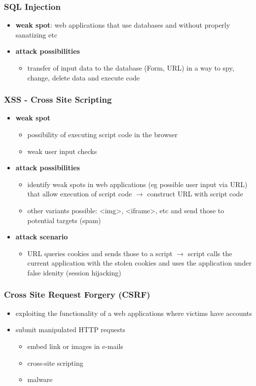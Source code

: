 \documentclass[11pt]{article}
\begin{document}
\subsubsection{SQL Injection}
\label{sec:orgee8e62e}
\begin{itemize}
\item \textbf{weak spot}: web applications that use databases and without properly sanatizing etc
\item \textbf{attack possibilities}
\begin{itemize}
\item transfer of input data to the database (Form, URL) in a way to spy, change, delete data and execute code
\end{itemize}
\end{itemize}
\subsubsection{XSS - Cross Site Scripting}
\label{sec:org5943793}
\begin{itemize}
\item \textbf{weak spot}
\begin{itemize}
\item possibility of executing script code in the browser
\item weak user input checks
\end{itemize}
\item \textbf{attack possibilities}
\begin{itemize}
\item identify weak spots in web applications (eg possible user input via URL) that allow execution of script code \(\rightarrow\) construct URL with script code
\item other variants possible: <img>, <iframe>, etc and send those to potential targets (spam)
\end{itemize}
\item \textbf{attack scenario}
\begin{itemize}
\item URL queries cookies and sends those to a script \(\rightarrow\) script calls the current application with the stolen cookies and uses the application under false idenity (session hijacking)
\end{itemize}
\end{itemize}
\subsubsection{Cross Site Request Forgery (CSRF)}
\label{sec:org653fc96}
\begin{itemize}
\item exploiting the functionality of a web applications where victims have accounts
\item submit manipulated HTTP requests
\begin{itemize}
\item embed link or images in e-mails
\item cross-site scripting
\item malware
\end{itemize}
\end{itemize}
\end{document}
